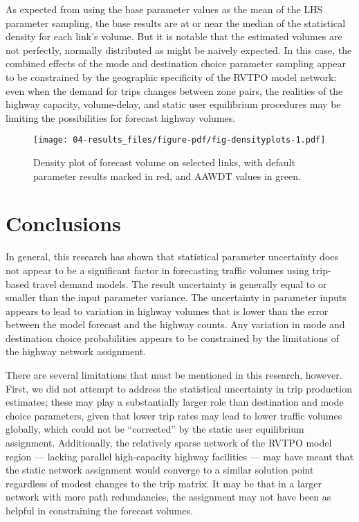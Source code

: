 \documentclass[
  letterpaper,
  authoryear,
  review,
  3p]{elsarticle}
\begin{document}
As expected from using the base parameter values as the mean of the LHS
parameter sampling, the base results are at or near the median of the
statistical density for each link's volume. But it is notable that the
estimated volumes are not perfectly, normally distributed as might be
naively expected. In this case, the combined effects of the mode and
destination choice parameter sampling appear to be constrained by the
geographic specificity of the RVTPO model network: even when the demand
for trips changes between zone pairs, the realities of the highway
capacity, volume-delay, and static user equilibrium procedures may be
limiting the possibilities for forecast highway volumes.

\begin{figure}

{\centering \texttt{[image: 04-results\_files/figure-pdf/fig-densityplots-1.pdf]}

}

\caption{\label{fig-densityplots}Density plot of forecast volume on
selected links, with default parameter results marked in red, and AAWDT
values in green.}

\end{figure}


\hypertarget{sec-conclusions}{%
\section{Conclusions}\label{sec-conclusions}}

In general, this research has shown that statistical parameter
uncertainty does not appear to be a significant factor in forecasting
traffic volumes using trip-based travel demand models. The result
uncertainty is generally equal to or smaller than the input parameter
variance. The uncertainty in parameter inputs appears to lead to
variation in highway volumes that is lower than the error between the
model forecast and the highway counts. Any variation in mode and
destination choice probabilities appears to be constrained by the
limitations of the highway network assignment.

There are several limitations that must be mentioned in this research,
however. First, we did not attempt to address the statistical
uncertainty in trip production estimates; these may play a substantially
larger role than destination and mode choice parameters, given that
lower trip rates may lead to lower traffic volumes globally, which could
not be ``corrected'' by the static user equilibrium assignment.
Additionally, the relatively sparse network of the RVTPO model region
--- lacking parallel high-capacity highway facilities --- may have meant
that the static network assignment would converge to a similar solution
point regardless of modest changes to the trip matrix. It may be that in
a larger network with more path redundancies, the assignment may not
have been as helpful in constraining the forecast volumes.
\end{document}
